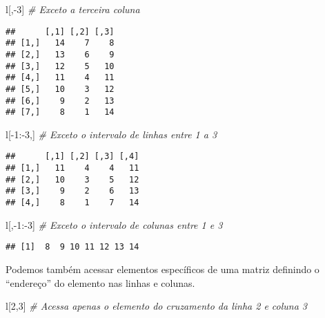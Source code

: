 \documentclass[
]{book}
\newenvironment{Shaded}{\begin{snugshade}}{\end{snugshade}}
\newcommand{\CommentTok}[1]{\textcolor[rgb]{0.56,0.35,0.01}{\textit{#1}}}
\newcommand{\DecValTok}[1]{\textcolor[rgb]{0.00,0.00,0.81}{#1}}
\newcommand{\NormalTok}[1]{#1}
\newcommand{\SpecialCharTok}[1]{\textcolor[rgb]{0.00,0.00,0.00}{#1}}
\begin{document}
\begin{Shaded}
\begin{Highlighting}[]
\NormalTok{l[,}\SpecialCharTok{{-}}\DecValTok{3}\NormalTok{] }\CommentTok{\# Exceto a terceira coluna}
\end{Highlighting}
\end{Shaded}

\begin{verbatim}
##      [,1] [,2] [,3]
## [1,]   14    7    8
## [2,]   13    6    9
## [3,]   12    5   10
## [4,]   11    4   11
## [5,]   10    3   12
## [6,]    9    2   13
## [7,]    8    1   14
\end{verbatim}

\begin{Shaded}
\begin{Highlighting}[]
\NormalTok{l[}\SpecialCharTok{{-}}\DecValTok{1}\SpecialCharTok{:{-}}\DecValTok{3}\NormalTok{,] }\CommentTok{\# Exceto o intervalo de linhas entre 1 a 3}
\end{Highlighting}
\end{Shaded}

\begin{verbatim}
##      [,1] [,2] [,3] [,4]
## [1,]   11    4    4   11
## [2,]   10    3    5   12
## [3,]    9    2    6   13
## [4,]    8    1    7   14
\end{verbatim}

\begin{Shaded}
\begin{Highlighting}[]
\NormalTok{l[,}\SpecialCharTok{{-}}\DecValTok{1}\SpecialCharTok{:{-}}\DecValTok{3}\NormalTok{] }\CommentTok{\# Exceto o intervalo de colunas entre 1 e 3}
\end{Highlighting}
\end{Shaded}

\begin{verbatim}
## [1]  8  9 10 11 12 13 14
\end{verbatim}

Podemos também acessar elementos específicos de uma matriz definindo o ``endereço'' do elemento nas linhas e colunas.

\begin{Shaded}
\begin{Highlighting}[]
\NormalTok{l[}\DecValTok{2}\NormalTok{,}\DecValTok{3}\NormalTok{] }\CommentTok{\# Acessa apenas o elemento do cruzamento da linha 2 e coluna 3}
\end{Highlighting}
\end{Shaded}
\end{document}
